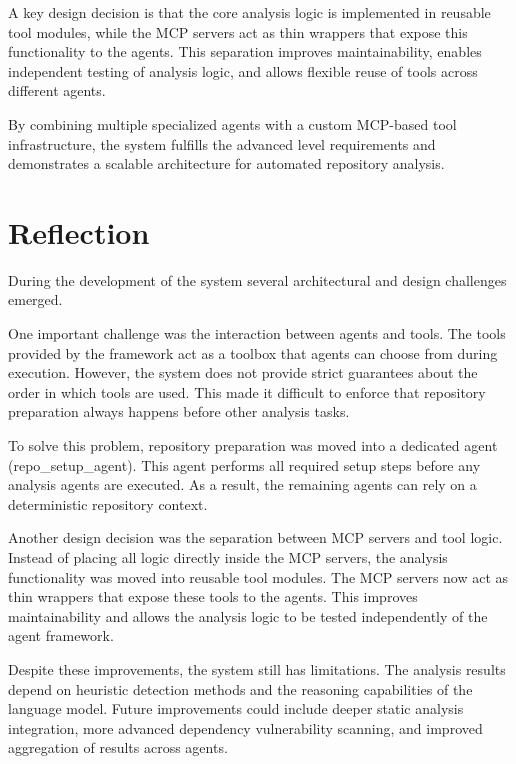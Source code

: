 \documentclass[conference]{IEEEtran}
\begin{document}
A key design decision is that the core analysis logic is implemented in reusable tool modules, while the MCP servers act as thin wrappers that expose this functionality to the agents. This separation improves maintainability, enables independent testing of analysis logic, and allows flexible reuse of tools across different agents.

By combining multiple specialized agents with a custom MCP-based tool infrastructure, the system fulfills the advanced level requirements and demonstrates a scalable architecture for automated repository analysis.

\section{Reflection}

During the development of the system several architectural and design challenges emerged.

One important challenge was the interaction between agents and tools. The tools provided by the framework act as a toolbox that agents can choose from during execution. However, the system does not provide strict guarantees about the order in which tools are used. This made it difficult to enforce that repository preparation always happens before other analysis tasks.

To solve this problem, repository preparation was moved into a dedicated agent (repo\_setup\_agent). This agent performs all required setup steps before any analysis agents are executed. As a result, the remaining agents can rely on a deterministic repository context.

Another design decision was the separation between MCP servers and tool logic. Instead of placing all logic directly inside the MCP servers, the analysis functionality was moved into reusable tool modules. The MCP servers now act as thin wrappers that expose these tools to the agents. This improves maintainability and allows the analysis logic to be tested independently of the agent framework.

Despite these improvements, the system still has limitations. The analysis results depend on heuristic detection methods and the reasoning capabilities of the language model. Future improvements could include deeper static analysis integration, more advanced dependency vulnerability scanning, and improved aggregation of results across agents.
\end{document}
